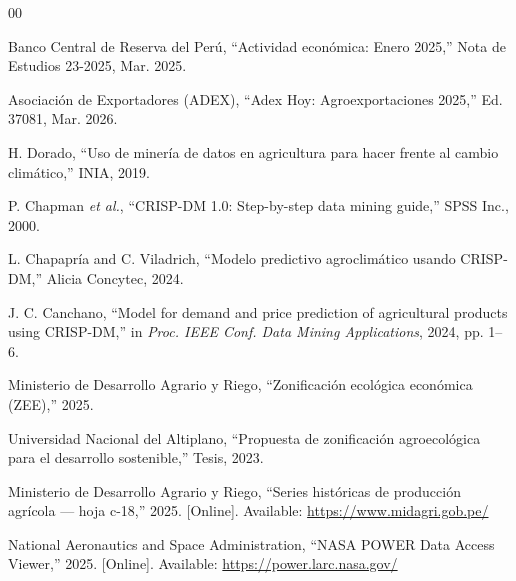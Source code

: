 \documentclass[conference]{IEEEtran}
\begin{document}
\begin{thebibliography}{00}

 Banco Central de Reserva del Perú, ``Actividad económica: Enero 2025,'' Nota de Estudios 23-2025, Mar. 2025.

 Asociación de Exportadores (ADEX), ``Adex Hoy: Agroexportaciones 2025,'' Ed. 37081, Mar. 2026.

 H. Dorado, ``Uso de minería de datos en agricultura para hacer frente al cambio climático,'' INIA, 2019.

 P. Chapman \textit{et al.}, ``CRISP-DM 1.0: Step-by-step data mining guide,'' SPSS Inc., 2000.

 L. Chapapría and C. Viladrich, ``Modelo predictivo agroclimático usando CRISP-DM,'' Alicia Concytec, 2024.

 J. C. Canchano, ``Model for demand and price prediction of agricultural products using CRISP-DM,'' in \textit{Proc. IEEE Conf. Data Mining Applications}, 2024, pp. 1--6.

 Ministerio de Desarrollo Agrario y Riego, ``Zonificación ecológica económica (ZEE),'' 2025.

 Universidad Nacional del Altiplano, ``Propuesta de zonificación agroecológica para el desarrollo sostenible,'' Tesis, 2023.

 Ministerio de Desarrollo Agrario y Riego, ``Series históricas de producción agrícola --- hoja c-18,'' 2025. [Online]. Available: \url{https://www.midagri.gob.pe/}

 National Aeronautics and Space Administration, ``NASA POWER Data Access Viewer,'' 2025. [Online]. Available: \url{https://power.larc.nasa.gov/}

\end{thebibliography}
\end{document}
